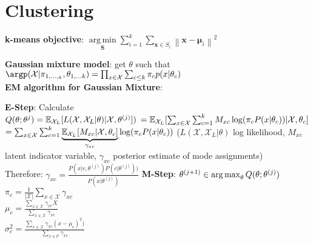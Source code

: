 \section{Clustering}

\textbf{k-means objective}: $\underset{\mathbf{S}} {\operatorname{arg\,min}}  \sum_{i=1}^{k} \sum_{\mathbf x \in S_i} \left\| \mathbf x - \boldsymbol\mu_i \right\|^2$

\textbf{Gaussian mixture model}: get $\theta$ such that\\
$\argp(\mathcal{X}|\pi_{1,...,_k},\theta_{1,...k})=\prod_{x\in\mathcal{X}}\sum_{c\leq k}\pi_c p(x|\theta_c)$\\


\textbf{EM algorithm for Gaussian Mixture}:

\begin{algorithmic}[1]
	\State \textbf{E-Step}: Calculate\\
        $Q(\theta;\theta^{j})=\mathbb E_{\mathcal{X}_L}[L(\mathcal{X},\mathcal{X}_L|\theta)|\mathcal{X},\theta^{(j)}])$
        $=\mathbb E_{\mathcal{X}_L}[\sum_{x\in\mathcal{X}}\sum_{c=1}^k M_{xc}\log(\pi_c P(x|\theta_c))|\mathcal{X},\theta_c]$ 
        $=\sum_{x\in\mathcal{X}}\sum_{c=1}^k\underbrace{\mathbb E_{\mathcal{X}_L}[M_{xc}|\mathcal{X},\theta_c]}_{\gamma_{xc}}\log(\pi_c P(x|\theta_c))$
        ($L(\mathcal{X},\mathcal{X}_L|\theta)$ log likelihood, $M_{xc}$ latent indicator variable, $\gamma_{xc}$ posterior estimate of mode assignments)\\
        Therefore: $\gamma_{xc}=\frac{P(x|c,\theta^{(j)})P(c|\theta^{(j)}))}{P(x|\theta^{(j)})}$
	\State \textbf{M-Step}: $\theta^{(j+1)}\in \operatorname*{arg\,max}_\theta Q(\theta; \theta^{(j)})$\\
	$\pi_c=\frac{1}{|\mathcal{X}|}\sum_{x\in\mathcal{X}}\gamma_{xc}$\\
	$\mu_c=\frac{\sum_{x\in\mathcal{X}}\gamma_{xc}X}{\sum_{x\in\mathcal{X}}\gamma_{xc}}$\\
	$\sigma^2_c=\frac{\sum_{x\in\mathcal{X}}\gamma_{xc}(x-\mu_c)^2)}{\sum_{x\in\mathcal{C}}\gamma_{xc}}$
\end{algorithmic}




